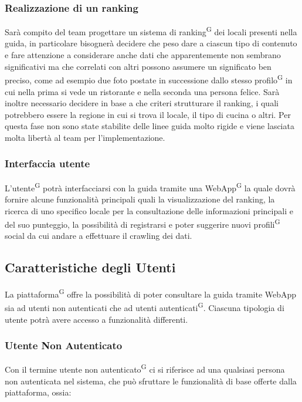 \subsubsection{Realizzazione di un ranking}
Sarà compito del team progettare un sistema di ranking\textsuperscript{G} dei locali presenti nella guida, in particolare bisognerà decidere che peso dare a ciascun tipo di contenuto e fare attenzione a considerare anche dati che apparentemente non sembrano significativi ma che correlati con altri possono assumere un significato ben preciso, come ad esempio due foto postate in successione dallo stesso profilo\textsuperscript{G} in cui nella prima si vede un ristorante e nella seconda una persona felice. Sarà inoltre necessario decidere in base a che criteri strutturare il ranking, i quali potrebbero essere la regione in cui si trova il locale, il tipo di cucina o altri. Per questa fase non sono state stabilite delle linee guida molto rigide e viene lasciata molta libertà al team per l’implementazione.

\subsubsection{Interfaccia utente}
L’utente\textsuperscript{G} potrà interfacciarsi con la guida tramite una WebApp\textsuperscript{G} la quale dovrà fornire alcune funzionalità principali quali la visualizzazione del ranking, la ricerca di uno specifico locale per la consultazione delle informazioni principali e del suo punteggio, la possibilità di registrarsi e poter suggerire nuovi profili\textsuperscript{G} social da cui andare a effettuare il crawling dei dati.

\subsection{Caratteristiche degli Utenti}

La piattaforma\textsuperscript{G} offre la possibilità di poter consultare la guida tramite WebApp sia ad utenti non autenticati che ad utenti autenticati\textsuperscript{G}. Ciascuna tipologia di utente potrà avere accesso a funzionalità differenti.

\subsubsection{Utente Non Autenticato}

Con il termine utente non autenticato\textsuperscript{G} ci si riferisce ad una qualsiasi persona non autenticata nel sistema, che può sfruttare le funzionalità di base offerte dalla piattaforma, ossia:

